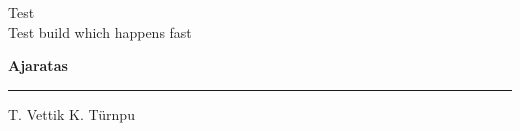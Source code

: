 \documentclass[12pt]{extbook}
\begin{document}
\rmfamily

\begin{titlepage}
  \null
  \begin{center}
    \vspace{1.5in}
    {\LARGE Test }\\
    { Test build which happens fast }
    \vfill
  \end{center}
\end{titlepage}

{
  \samepage
  \raggedbottom
  \raggedright
  \sloppy


  \vspace{0.2in}
    \centerline{
      \bfseries
      \large Ajaratas
    }
  \nopagebreak[4]
  \vspace{0.1in}
  \nopagebreak[4]
  \hrule height 0.05ex
  \nopagebreak[4]
  \vspace{-0.05in}

  {\footnotesize T. Vettik \hfill K. T\"urnpu }\\
  \vspace{0.01in}



}
\end{document}
